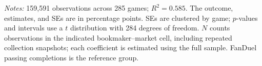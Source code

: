 \begin{table}[H]
\begin{tabular}{lrrrlr}
\bottomrule
\end{tabular}
\par\vspace{4pt}
\begin{minipage}{0.95\textwidth}
\footnotesize
\emph{Notes:} 159,591 observations across 285 games; $R^2=0.585$. The outcome, estimates, and SEs are in percentage points. SEs are clustered by game; $p$-values and intervals use a $t$ distribution with 284 degrees of freedom. $N$ counts observations in the indicated bookmaker--market cell, including repeated collection snapshots; each coefficient is estimated using the full sample. FanDuel passing completions is the reference group.
\end{minipage}
\end{table}
